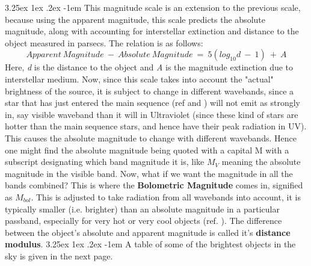\documentclass[a4paper,twoside,11pt]{article}
\makeatletter
\numberwithin{equation}{section}
\renewcommand\paragraph{\@startsection{paragraph}{5}{\z@}%
  {3.25ex \@plus1ex \@minus.2ex}%
  {-1em}%
  {\normalfont\normalsize\bfseries}}
\makeatother
\begin{document}
\paragraph{}
This magnitude scale is an extension to the previous scale, because using the apparent magnitude, this scale predicts the absolute magnitude, along with accounting for interstellar extinction and distance to the object measured in parsecs. The relation is as follows:
\begin{equation}
    Apparent \ Magnitude \ - \ Absolute \ Magnitude \ = \ 5(log_{10} d \ - \ 1) \ + \ A
\end{equation}
Here, \textit{d} is the distance to the object and \textit{A} is the magnitude extinction due to interstellar medium. Now, since this scale takes into account the "actual" brightness of the source, it is subject to change in different wavebands, since a star that has just entered the main sequence (ref \cite{ARC} and \cite{BasuIntro}) will not emit as strongly in, say visible waveband than it will in Ultraviolet (since these kind of stars are hotter than the main sequence stars, and hence have their peak radiation in UV). This causes the absolute magnitude to change with different wavebands. Hence one might find the absolute magnitude being quoted with a capital M with a subscript designating which band magnitude it is, like $M_V$ meaning the absolute magnitude in the visible band. Now, what if we want the magnitude in all the bands combined? This is where the \textbf{Bolometric Magnitude} comes in, signified as $M_{bol}$. This is adjusted to take radiation from all wavebands into account, it is typically smaller (i.e. brighter) than an absolute magnitude in a particular passband, especially for very hot or very cool objects (ref. \cite{StellarMag}). The difference between the object's absolute and apparent magnitude is called it's \textbf{distance modulus}. 
\paragraph{}
A table of some of the brightest objects in the sky is given in the next page.
\end{document}
